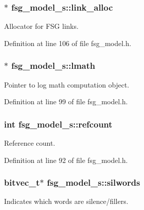 \subsubsection[{link\+\_\+alloc}]{$\ast$ fsg\+\_\+model\+\_\+s\+::link\+\_\+alloc}\label{structfsg__model__s_ac4e2a36305bbe62a5c7468588eb058b1}


Allocator for F\+S\+G links. 



Definition at line 106 of file fsg\+\_\+model.\+h.

\subsubsection[{lmath}]{$\ast$ fsg\+\_\+model\+\_\+s\+::lmath}\label{structfsg__model__s_ab0b22dadb593ee1901829f89c4a47fe2}


Pointer to log math computation object. 



Definition at line 99 of file fsg\+\_\+model.\+h.

\subsubsection[{refcount}]{\setlength{\rightskip}{0pt plus 5cm}int fsg\+\_\+model\+\_\+s\+::refcount}\label{structfsg__model__s_af329127556a42f6ea3b27f41a99a0b17}


Reference count. 



Definition at line 92 of file fsg\+\_\+model.\+h.

\subsubsection[{silwords}]{\setlength{\rightskip}{0pt plus 5cm}bitvec\+\_\+t$\ast$ fsg\+\_\+model\+\_\+s\+::silwords}\label{structfsg__model__s_ab5709e67c1b7506ab024f2060d50331c}


Indicates which words are silence/fillers. 



